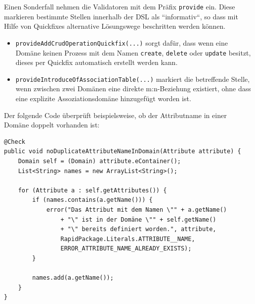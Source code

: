 \documentclass[a4paper,12pt]{scrreprt}
\begin{document}
Einen Sonderfall nehmen die Validatoren mit dem Präfix \verb+provide+ ein. Diese markieren bestimmte Stellen innerhalb der DSL als ``informativ``, so dass mit Hilfe von Quickfixes alternative Lösungswege beschritten werden können.
\begin{itemize}
	\item \verb+provideAddCrudOperationQuickfix(...)+ sorgt dafür, dass wenn eine Do\-mä\-ne keinen Prozess mit dem Namen \verb+create+, \verb+delete+ oder \verb+update+ besitzt, dieses per Quickfix automatisch erstellt werden kann.
	\item \verb+provideIntroduceOfAssociationTable(...)+ markiert die betreffende Stelle, wenn zwischen zwei Domänen eine direkte m:n-Beziehung existiert, ohne dass eine explizite Assoziationsdomäne hinzugefügt worden ist.
\end{itemize}

Der folgende Code überprüft beispielsweise, ob der Attributname in einer Domäne doppelt vorhanden ist:
\begin{verbatim}
@Check
public void noDuplicateAttributeNameInDomain(Attribute attribute) {
    Domain self = (Domain) attribute.eContainer();
    List<String> names = new ArrayList<String>();

    for (Attribute a : self.getAttributes()) {
        if (names.contains(a.getName())) {
            error("Das Attribut mit dem Namen \"" + a.getName()
                + "\" ist in der Domäne \"" + self.getName()
                + "\" bereits definiert worden.", attribute,
                RapidPackage.Literals.ATTRIBUTE__NAME,
                ERROR_ATTRIBUTE_NAME_ALREADY_EXISTS);
        }
        
        names.add(a.getName());
    }
}
\end{verbatim}
\end{document}
